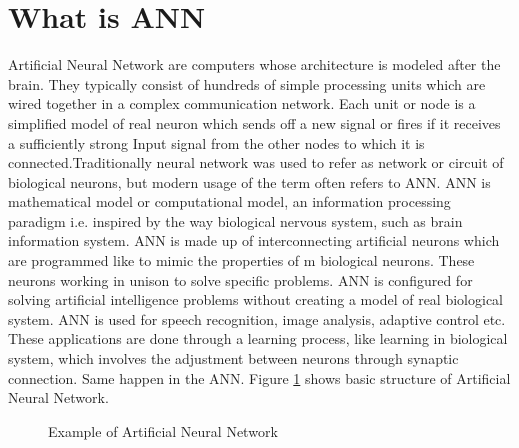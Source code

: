 \documentclass[12pt]{report}
\begin{document}
\section{What is ANN}
Artificial Neural Network are computers whose architecture is modeled after the brain. They typically consist of hundreds of simple processing units which are wired together in a complex communication network. Each unit or node is a simplified model of real neuron which sends off a new signal or fires if it receives a sufficiently strong Input signal from the other nodes to which it is connected.Traditionally neural network was used to refer as network or circuit of biological neurons, but modern usage of the term often refers to ANN. ANN is mathematical model or computational model, an information processing paradigm i.e. inspired by the way biological nervous system, such as brain information system. ANN is made up of interconnecting artificial neurons which are programmed like to mimic the properties of m biological neurons. These neurons working in unison to solve specific problems. ANN is configured for solving artificial intelligence problems without creating a model of real biological system. ANN is used for speech recognition, image analysis, adaptive control etc. These applications are done through a learning process, like learning in biological system, which involves the adjustment between neurons through synaptic connection. Same happen in the ANN. Figure \ref{ANN} shows basic structure of Artificial Neural Network.
\begin{figure}[htbp]
	\caption{Example of Artificial Neural Network}
	\label{ANN}
\end{figure}
\end{document}
